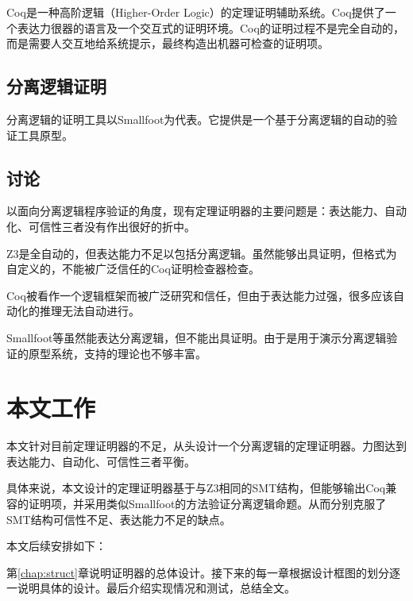Coq\cite{coq}是一种高阶逻辑（Higher-Order Logic）的定理证明辅助系统。Coq提供了一个表达力很器的语言及一个交互式的证明环境。Coq的证明过程不是完全自动的，而是需要人交互地给系统提示，最终构造出机器可检查的证明项。

\subsection{分离逻辑证明}
分离逻辑的证明工具以Smallfoot\cite{smallfoot}为代表。它提供是一个基于分离逻辑的自动的验证工具原型。

\subsection{讨论}
以面向分离逻辑程序验证的角度，现有定理证明器的主要问题是：表达能力、自动化、可信性三者没有作出很好的折中。

Z3是全自动的，但表达能力不足以包括分离逻辑。虽然能够出具证明，但格式为自定义的，不能被广泛信任的Coq证明检查器检查。

Coq被看作一个逻辑框架而被广泛研究和信任，但由于表达能力过强，很多应该自动化的推理无法自动进行。

Smallfoot等虽然能表达分离逻辑，但不能出具证明。由于是用于演示分离逻辑验证的原型系统，支持的理论也不够丰富。

\section{本文工作}
本文针对目前定理证明器的不足，从头设计一个分离逻辑的定理证明器。力图达到表达能力、自动化、可信性三者平衡。

具体来说，本文设计的定理证明器基于与Z3相同的SMT结构，但能够输出Coq兼容的证明项，并采用类似Smallfoot的方法验证分离逻辑命题。从而分别克服了SMT结构可信性不足、表达能力不足的缺点。

本文后续安排如下：

第\ref{chap:struct}章说明证明器的总体设计。接下来的每一章根据设计框图的划分逐一说明具体的设计。最后介绍实现情况和测试，总结全文。
